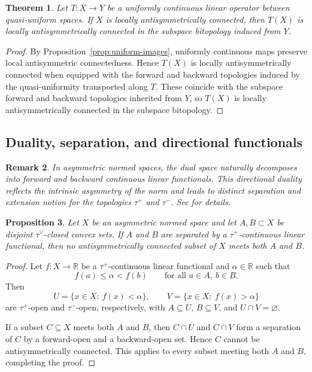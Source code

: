 \documentclass[preprint,12pt]{elsarticle}
\newtheorem{theorem}{Theorem}[section]
\newtheorem{proposition}[theorem]{Proposition}
\newtheorem{remark}[theorem]{Remark}
\begin{document}
\medskip

\begin{theorem}
\label{thm:fa-connectedness-preservation}
Let $T:X\to Y$ be a uniformly continuous linear operator between
quasi-uniform spaces. If $X$ is locally antisymmetrically connected,
then $T(X)$ is locally antisymmetrically connected in the subspace
bitopology induced from $Y$.
\end{theorem}

\begin{proof}
By Proposition~\ref{prop:uniform-images}, uniformly continuous maps
preserve local antisymmetric connectedness. Hence $T(X)$ is locally
antisymmetrically connected when equipped with the forward and backward
topologies induced by the quasi-uniformity transported along $T$. These
coincide with the subspace forward and backward topologies inherited
from $Y$, so $T(X)$ is locally antisymmetrically connected in the
subspace bitopology.
\end{proof}

\subsection{Duality, separation, and directional functionals}
\label{ssec:fa-duality}

\begin{remark}
\label{rem:fa-duality}
In asymmetric normed spaces, the dual space naturally decomposes into
forward and backward continuous linear functionals. This directional
duality reflects the intrinsic asymmetry of the norm and leads to
distinct separation and extension notion for the topologies
$\tau^{+}$ and $\tau^{-}$. See \cite{Cobzas2013,CobzasHB} for details.
\end{remark}

\medskip

\begin{proposition}
\label{prop:fa-separation}
Let $X$ be an asymmetric normed space and let $A,B\subset X$ be disjoint
$\tau^{\vee}$-closed convex sets. If $A$ and $B$ are separated by a
$\tau^{+}$-continuous linear functional, then no antisymmetrically
connected subset of $X$ meets both $A$ and $B$.
\end{proposition}

\begin{proof}
Let $f:X\to\mathbb{R}$ be a $\tau^{+}$-continuous linear functional and
$\alpha\in\mathbb{R}$ such that
\[
f(a)\le \alpha < f(b)
\qquad\text{for all } a\in A,\ b\in B.
\]
Then
\[
U=\{x\in X:\ f(x)<\alpha\}, \qquad
V=\{x\in X:\ f(x)>\alpha\}
\]
are $\tau^{+}$-open and $\tau^{-}$-open, respectively, with
$A\subseteq U$, $B\subseteq V$, and $U\cap V=\varnothing$.

If a subset $C\subseteq X$ meets both $A$ and $B$, then $C\cap U$ and
$C\cap V$ form a separation of $C$ by a forward-open and a backward-open
set. Hence $C$ cannot be antisymmetrically connected. This applies to
every subset meeting both $A$ and $B$, completing the proof.
\end{proof}
\end{document}
